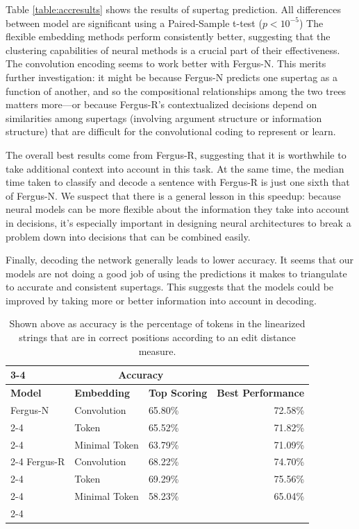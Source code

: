\documentclass[11pt]{article}
\begin{document}
Table \ref{table:accresults} shows the results of supertag
prediction.
%
All differences between model are significant using a Paired-Sample t-test ($p<10^{-5}$)
%
The flexible embedding methods perform consistently better,
suggesting that the clustering capabilities of neural methods is a
crucial part of their effectiveness.
%
The convolution encoding seems to work better with Fergus-N.  
%
This merits further investigation: it might be because Fergus-N
predicts one supertag as a function of another, and so the
compositional relationships among the two trees matters more---or
because Fergus-R's contextualized decisions depend on similarities
among supertags (involving argument structure or information
structure) that are difficult for the convolutional coding to
represent or learn.

The overall best results come from Fergus-R, suggesting that it is
worthwhile to take additional context into account in this task.
%
At the same time, the median time taken to classify and decode a
sentence with Fergus-R is just one sixth that of Fergus-N.
%
We suspect that there is a general lesson in this speedup: because
neural models can be more flexible about the information they take
into account in decisions, it's especially important in designing
neural architectures to break a problem down into decisions that can
be combined easily.

Finally, decoding the network generally leads to lower accuracy.
%
It seems that our models are not doing a good job of using the
predictions it makes to triangulate to accurate and consistent
supertags. 
%
This suggests that the models could be improved by taking more or
better information into account in decoding.

\begin{table}
\centering
\begin{tabular}{|l|p{3cm}|p{2.5cm}|r|}
\cline{3-4}
\multicolumn{2}{}{} & \multicolumn{2}{|c|}{Accuracy}   \\ \hline
\textbf{Model} & \textbf{Embedding}  & \textbf{Top Scoring} & \textbf{Best Performance} \\ \hline
Fergus-N & Convolution & 65.80\% & 72.58\% \\ \cline{2-4}
         & Token       & 65.52\%  & 71.82\% \\ \cline{2-4}
         & Minimal Token & 63.79\% & 71.09\% \\ \cline{2-4}
\hline
Fergus-R & Convolution & 68.22\% & 74.70\% \\ \cline{2-4}
         & Token       &  69.29\% & 75.56\% \\ \cline{2-4}
         & Minimal Token &  58.23\% & 65.04\% \\ \cline{2-4}
\hline
\end{tabular}
\caption{Shown above as accuracy is the percentage of tokens in the linearized strings that are in correct positions according to an edit distance measure.}
\label{table:linresults}
\end{table}
\end{document}
